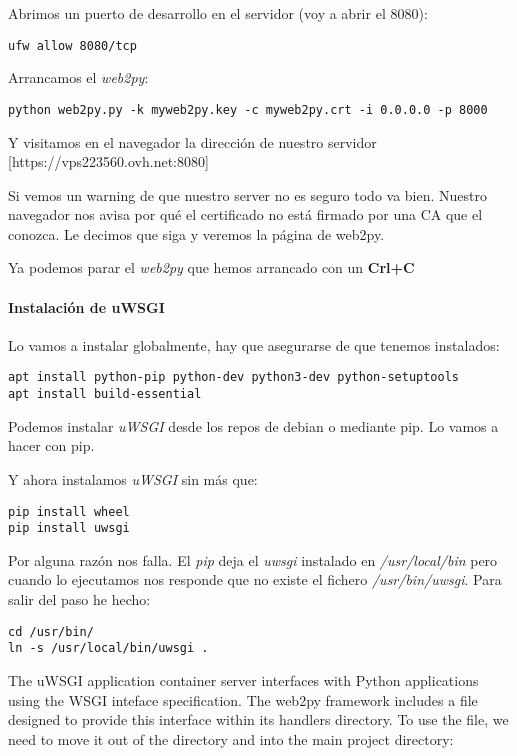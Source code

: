 \documentclass[12pt,spanish,]{article}
\let\oldparagraph\paragraph
\renewcommand{\paragraph}[1]{\oldparagraph{#1}\mbox{}}
\begin{document}
Abrimos un puerto de desarrollo en el servidor (voy a abrir el 8080):

\begin{verbatim}
ufw allow 8080/tcp
\end{verbatim}

Arrancamos el \emph{web2py}:

\begin{verbatim}
python web2py.py -k myweb2py.key -c myweb2py.crt -i 0.0.0.0 -p 8000
\end{verbatim}

Y visitamos en el navegador la dirección de nuestro servidor
{[}https://vps223560.ovh.net:8080{]}

Si vemos un warning de que nuestro server no es seguro todo va bien.
Nuestro navegador nos avisa por qué el certificado no está firmado por
una CA que el conozca. Le decimos que siga y veremos la página de
web2py.

Ya podemos parar el \emph{web2py} que hemos arrancado con un
\textbf{Crl+C}

\paragraph{Instalación de uWSGI}\label{instalaciuxf3n-de-uwsgi}

Lo vamos a instalar globalmente, hay que asegurarse de que tenemos
instalados:

\begin{verbatim}
apt install python-pip python-dev python3-dev python-setuptools
apt install build-essential
\end{verbatim}

Podemos instalar \emph{uWSGI} desde los repos de debian o mediante pip.
Lo vamos a hacer con pip.

Y ahora instalamos \emph{uWSGI} sin más que:

\begin{verbatim}
pip install wheel
pip install uwsgi
\end{verbatim}

Por alguna razón nos falla. El \emph{pip} deja el \emph{uwsgi} instalado
en \emph{/usr/local/bin} pero cuando lo ejecutamos nos responde que no
existe el fichero \emph{/usr/bin/uwsgi}. Para salir del paso he hecho:

\begin{verbatim}
cd /usr/bin/
ln -s /usr/local/bin/uwsgi .
\end{verbatim}

The uWSGI application container server interfaces with Python
applications using the WSGI inteface specification. The web2py framework
includes a file designed to provide this interface within its handlers
directory. To use the file, we need to move it out of the directory and
into the main project directory:
\end{document}
